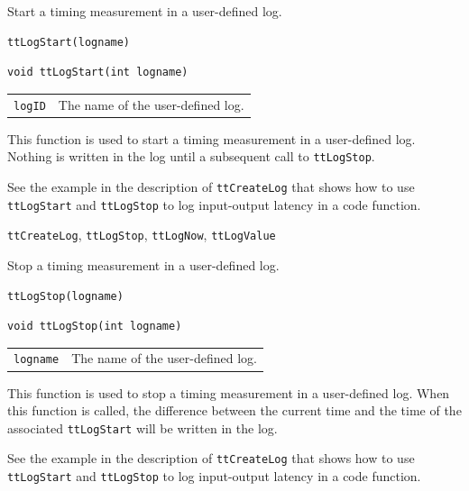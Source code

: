\documentclass[final,twoside]{rapport}
\begin{document}
\purpose
Start a timing measurement in a user-defined log.

\Msyntax
\begin{verbatim}
ttLogStart(logname)
\end{verbatim}

\Csyntax
\begin{verbatim}
void ttLogStart(int logname)
\end{verbatim}

\args
\begin{tabularx}{\hsize}{l>{\raggedright\arraybackslash}X}
  {\tt logID} & The name of the user-defined log. \\
\end{tabularx}

\descr This function is used to start a timing measurement in a user-defined
log. Nothing is written in the log until a subsequent call to
\texttt{ttLogStop}.

\example See the example in the description of \texttt{ttCreateLog}
that shows how to use \texttt{ttLog\-Start} and \texttt{ttLogStop} to
log input-output latency in a code function.

\seealso
{\tt ttCreateLog}, {\tt ttLogStop}, {\tt ttLogNow}, {\tt ttLogValue} 



\purpose
Stop a timing measurement in a user-defined log.

\Msyntax
\begin{verbatim}
ttLogStop(logname)
\end{verbatim}

\Csyntax
\begin{verbatim}
void ttLogStop(int logname) 
\end{verbatim}

\args
\begin{tabularx}{\hsize}{l>{\raggedright\arraybackslash}X}
  {\tt logname} & The name of the user-defined log. \\
\end{tabularx}

\descr This function is used to stop a timing measurement in a user-defined
log. When this function is called, the difference between the current time and
the time of the associated \texttt{ttLogStart} will be written in the log.

\example See the example in the description of \texttt{ttCreateLog}
that shows how to use \texttt{ttLog\-Start} and \texttt{ttLogStop} to
log input-output latency in a code function.
\end{document}
